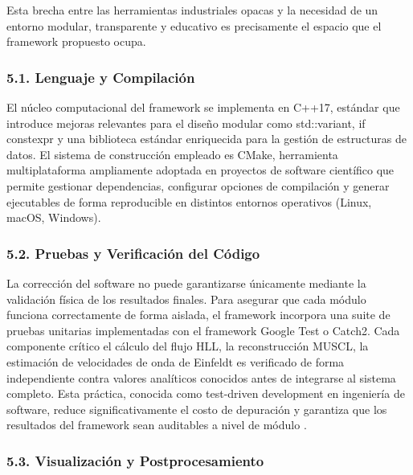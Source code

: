 \documentclass[11pt,openany]{book}
\begin{document}
Esta brecha entre las herramientas industriales opacas y la necesidad de un entorno modular, transparente y educativo es precisamente el espacio que el framework propuesto ocupa.

\subsubsection{5.1. Lenguaje y Compilación}\textbf{}

El núcleo computacional del framework se implementa en C++17, estándar que introduce mejoras relevantes para el diseño modular como std::variant, if constexpr y una biblioteca estándar enriquecida para la gestión de estructuras de datos. El sistema de construcción empleado es CMake, herramienta multiplataforma ampliamente adoptada en proyectos de software científico que permite gestionar dependencias, configurar opciones de compilación y generar ejecutables de forma reproducible en distintos entornos operativos (Linux, macOS, Windows).

\subsubsection{5.2. Pruebas y Verificación del Código}\textbf{}

La corrección del software no puede garantizarse únicamente mediante la validación física de los resultados finales. Para asegurar que cada módulo funciona correctamente de forma aislada, el framework incorpora una suite de pruebas unitarias implementadas con el framework Google Test o Catch2. Cada componente crítico el cálculo del flujo HLL, la reconstrucción MUSCL, la estimación de velocidades de onda de Einfeldt es verificado de forma independiente contra valores analíticos conocidos antes de integrarse al sistema completo. Esta práctica, conocida como test-driven development en ingeniería de software, reduce significativamente el costo de depuración y garantiza que los resultados del framework sean auditables a nivel de módulo \parencite{ramachandrappa2024solid}.

\subsubsection{5.3. Visualización y Postprocesamiento}\textbf{}
\end{document}
